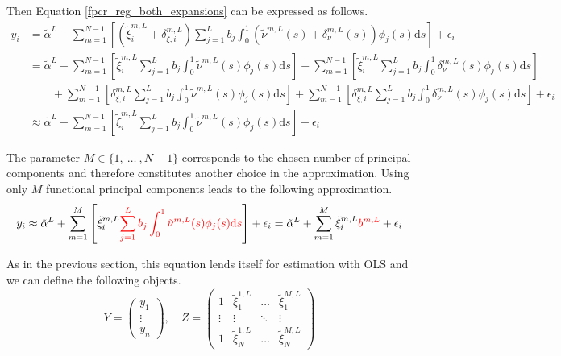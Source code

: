 \documentclass[11pt,twoside,a4paper]{article}
\begin{document}
	Then Equation \ref{fpcr_reg_both_expansions} can be expressed as follows.
	\begin{equation}
		\begin{split}
			y_i & = \tilde{\alpha}^L
			+ \sum_{m = 1}^{N-1} \left[ \left(\tilde{\xi}^{m,L}_{i} + \delta_{\xi, i}^{m, L} \right) \sum_{j = 1}^{L} b_j \int_{0}^{1} \left(\tilde{\nu}^{m,L}(s) + \delta_{\nu}^{m,L}(s) \right) \phi_j(s) \mathrm{d}s \right] 
			+ \epsilon_i \\
			& = \tilde{\alpha}^L
			+ \sum_{m = 1}^{N-1} \left[ \tilde{\xi}^{m,L}_{i} \sum_{j = 1}^{L} b_j \int_{0}^{1} \tilde{\nu}^{m,L}(s) \phi_j(s) \mathrm{d}s \right] 
			+ \sum_{m = 1}^{N-1} \left[ \tilde{\xi}^{m,L}_{i} \sum_{j = 1}^{L} b_j \int_{0}^{1} \delta_{\nu}^{m,L}(s) \phi_j(s) \mathrm{d}s \right] \\
			& \quad \quad + \sum_{m = 1}^{N-1} \left[ \delta_{\xi, i}^{m, L} \sum_{j = 1}^{L} b_j \int_{0}^{1} \tilde{\nu}^{m,L}(s) \phi_j(s) \mathrm{d}s \right] 
			+ \sum_{m = 1}^{N-1} \left[ \delta_{\xi, i}^{m, L} \sum_{j = 1}^{L} b_j \int_{0}^{1} \delta_{\nu}^{m,L}(s) \phi_j(s) \mathrm{d}s \right]
			+ \epsilon_i \\
			& \approx \tilde{\alpha}^L
			+ \sum_{m = 1}^{N-1} \left[ \tilde{\xi}^{m,L}_{i} \sum_{j = 1}^{L} b_j \int_{0}^{1} \tilde{\nu}^{m,L}(s) \phi_j(s) \mathrm{d}s \right] + \epsilon_i
		\end{split}
	\end{equation}

	The parameter $M \in \{1,\: \dots \:, N-1\}$ corresponds to the chosen number of principal components and therefore constitutes another choice in the approximation. Using only $M$ functional principal components leads to the following approximation.
	\begin{equation}
		y_i \approx \tilde{\alpha}^L
		+ \sum_{m = 1}^{M} \left[ \tilde{\xi}^{m,L}_{i} {\color{red}\sum_{j = 1}^{L} b_j \int_{0}^{1} \tilde{\nu}^{m,L}(s) \phi_j(s) \mathrm{d}s} \right] + \epsilon_i 
		= \tilde{\alpha}^L
		+ \sum_{m = 1}^{M} \tilde{\xi}^{m,L}_{i} {\color{red}\bar{b}^{m,L}} + \epsilon_i
	\end{equation}
	

	As in the previous section, this equation lends itself for estimation with OLS and we can define the following objects.
	\begin{equation}
		Y = \begin{pmatrix}
			y_1 \\ \vdots \\ y_n
		\end{pmatrix}, \quad
		Z = \begin{pmatrix}
			1 & \tilde{\xi}^{1,L}_{1} & \dots & \tilde{\xi}^{M,L}_{1} \\
			\vdots & \vdots & \ddots & \vdots \\
			1 & \tilde{\xi}^{1,L}_{N} & \dots & \tilde{\xi}^{M,L}_{N}
		\end{pmatrix}
	\end{equation}
	
\end{document}

